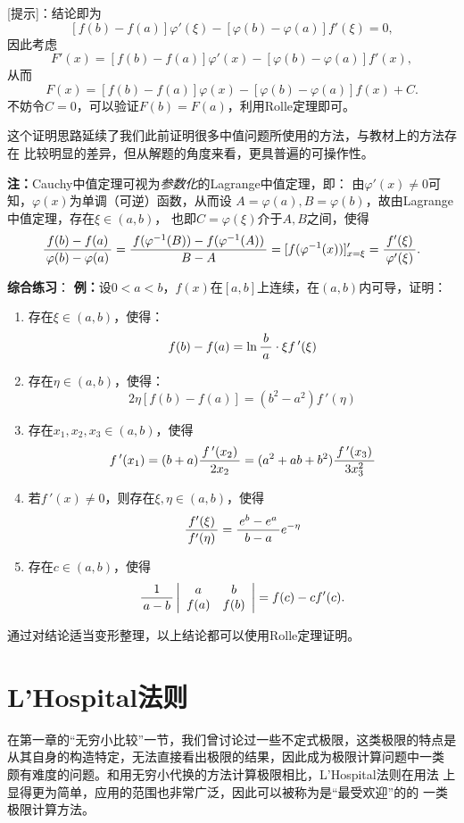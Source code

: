 [提示]：结论即为
$$[f(b)-f(a)]\varphi'(\xi)-[\varphi(b)-\varphi(a)]f'(\xi)=0,$$
因此考虑
$$F'(x)=[f(b)-f(a)]\varphi'(x)-[\varphi(b)-\varphi(a)]f'(x),$$
从而
$$F(x)=[f(b)-f(a)]\varphi(x)-[\varphi(b)-\varphi(a)]f(x)+C.$$
不妨令$C=0$，可以验证$F(b)=F(a)$，利用Rolle定理即可。

这个证明思路延续了我们此前证明很多中值问题所使用的方法，与教材上的方法存在
比较明显的差异，但从解题的角度来看，更具普遍的可操作性。

{\bf 注：}Cauchy中值定理可视为{\it 参数化}的Lagrange中值定理，即：
由$\varphi'(x)\ne 0$可知，$\varphi(x)$为单调（可逆）函数，从而设
$A=\varphi(a),B=\varphi(b)$，故由Lagrange中值定理，存在$\xi\in(a,b)$，
也即$C=\varphi(\xi)$介于$A,B$之间，使得
$$\displaystyle\frac{\,{f(b)-f(a)}\,}{\,{\varphi(b)-\varphi(a)}\,}
=\displaystyle\frac{\,{f(\varphi^{-1}(B))-f(\varphi^{-1}(A))}\,}{\,{B-A}\,}
=[f(\varphi^{-1}(x))]'_{x=\xi}=\displaystyle\frac{\,{f'(\xi)}\,}{\,{\varphi'(\xi)}\,}.$$

{\bf 综合练习}：
{\bf 例：}设$0<a<b$，$f(x)$在$[a,b]$上连续，在$(a,b)$内可导，证明：
\begin{enumerate}[(1)]
  \setlength{\itemindent}{1cm}
  \item 存在$\xi\in(a,b)$，使得：
	$$f(b)-f(a)=\ln\displaystyle\frac{\,{b}\,}{\,{a}\,}\cdot \xi f\,'(\xi)$$
  \item 存在$\eta\in(a,b)$，使得：
    $$2\eta[f(b)-f(a)]=(b^2-a^2)f\,'(\eta)$$
  \item 存在$x_1,x_2,x_3\in(a,b)$，使得
	$$f\,'(x_1)=(b+a)\displaystyle\frac{\,{f\,'(x_2)}\,}{\,{2x_2}\,}=(a^2+ab+b^2)
	\displaystyle\frac{\,{f\,'(x_3)}\,}{\,{3x_3^2}\,}$$ 
  \item 若$f\,'(x)\ne 0$，则存在$\xi,\eta\in(a,b)$，使得
	$$\displaystyle\frac{\,{f'(\xi)}\,}{\,{f'(\eta)}\,}=\displaystyle\frac{\,{e^b-e^a}\,}{\,{b-a}\,}e^{-\eta}$$
  \item 存在$c\in(a,b)$，使得
	$$\displaystyle\frac{\,{1}\,}{\,{a-b}\,}\left|\begin{array}{cc}
	a & b\\ f(a) & f(b)
	\end{array}\right|=f(c)-cf'(c).$$
\end{enumerate}

通过对结论适当变形整理，以上结论都可以使用Rolle定理证明。

\section{L'Hospital法则}

在第一章的“无穷小比较”一节，我们曾讨论过一些不定式极限，这类极限的特点是
从其自身的构造特定，无法直接看出极限的结果，因此成为极限计算问题中一类
颇有难度的问题。和用无穷小代换的方法计算极限相比，L'Hospital法则在用法
上显得更为简单，应用的范围也非常广泛，因此可以被称为是“最受欢迎”的的
一类极限计算方法。

